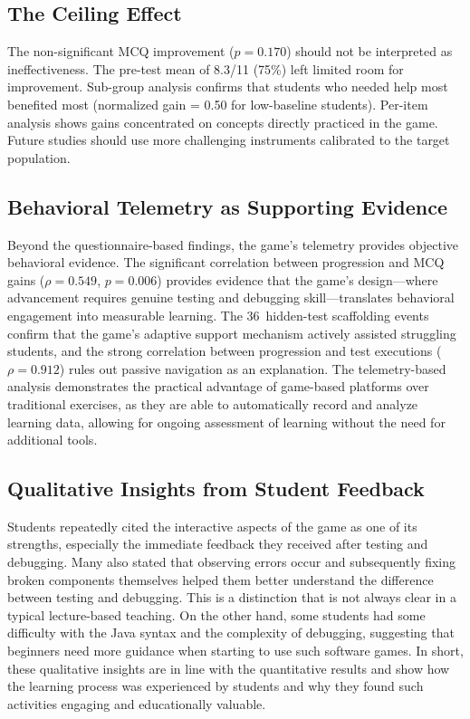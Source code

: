 \documentclass[conference]{IEEEtran}
\begin{document}
\subsection{The Ceiling Effect}

The non-significant MCQ improvement ($p = 0.170$) should not be interpreted as ineffectiveness.
The pre-test mean of 8.3/11 (75\%) left limited room for improvement.
Sub-group analysis confirms that students who needed help most benefited most (normalized gain = 0.50 for low-baseline students).
Per-item analysis shows gains concentrated on concepts directly practiced in the game.
Future studies should use more challenging instruments calibrated to the target population.

\subsection{Behavioral Telemetry as Supporting Evidence}

Beyond the questionnaire-based findings, the game's telemetry provides objective behavioral evidence.
The significant correlation between progression and MCQ gains ($\rho = 0.549$, $p = 0.006$) provides evidence that the game's design---where advancement requires genuine testing and debugging skill---translates behavioral engagement into measurable learning.
The 36~hidden-test scaffolding events confirm that the game's adaptive support mechanism actively assisted struggling students, and the strong correlation between progression and test executions ($\rho = 0.912$) rules out passive navigation as an explanation.
The telemetry-based analysis demonstrates the practical advantage of game-based platforms over traditional exercises, as they are able to automatically record and analyze learning data, allowing for ongoing assessment of learning without the need for additional tools.



\subsection{Qualitative Insights from Student Feedback}
Students repeatedly cited the interactive aspects of the game as one of its strengths, especially the immediate feedback they received after testing and debugging. Many also stated that observing errors occur and subsequently fixing broken components themselves helped them better understand the difference between testing and debugging. This is a distinction that is not always clear in a typical lecture-based teaching. On the other hand, some students had some difficulty with the Java syntax and the complexity of debugging, suggesting that beginners need more guidance when starting to use such software games. In short, these qualitative insights are in line with the quantitative results and show how the learning process was experienced by students and why they found such activities engaging and educationally valuable.
\end{document}
